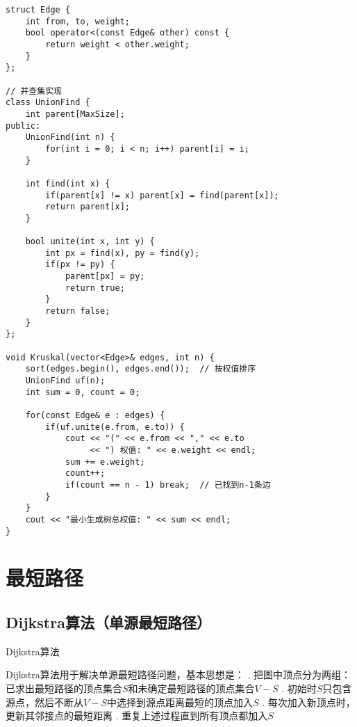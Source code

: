 \documentclass[12pt,a4paper]{amsart}
\begin{document}
\begin{lstlisting}[caption=Kruskal算法实现]
struct Edge {
    int from, to, weight;
    bool operator<(const Edge& other) const {
        return weight < other.weight;
    }
};

// 并查集实现
class UnionFind {
    int parent[MaxSize];
public:
    UnionFind(int n) {
        for(int i = 0; i < n; i++) parent[i] = i;
    }
    
    int find(int x) {
        if(parent[x] != x) parent[x] = find(parent[x]);
        return parent[x];
    }
    
    bool unite(int x, int y) {
        int px = find(x), py = find(y);
        if(px != py) {
            parent[px] = py;
            return true;
        }
        return false;
    }
};

void Kruskal(vector<Edge>& edges, int n) {
    sort(edges.begin(), edges.end());  // 按权值排序
    UnionFind uf(n);
    int sum = 0, count = 0;
    
    for(const Edge& e : edges) {
        if(uf.unite(e.from, e.to)) {
            cout << "(" << e.from << "," << e.to 
                 << ") 权值: " << e.weight << endl;
            sum += e.weight;
            count++;
            if(count == n - 1) break;  // 已找到n-1条边
        }
    }
    cout << "最小生成树总权值: " << sum << endl;
}
\end{lstlisting}

\section{最短路径}

\subsection{Dijkstra算法（单源最短路径）}

\begin{algorithm}[H]
\caption{Dijkstra算法}
\begin{algorithmic}[1]
\STATE Dijkstra算法用于解决单源最短路径问题，基本思想是：
. 把图中顶点分为两组：已求出最短路径的顶点集合$S$和未确定最短路径的顶点集合$V-S$
. 初始时$S$只包含源点，然后不断从$V-S$中选择到源点距离最短的顶点加入$S$
. 每次加入新顶点时，更新其邻接点的最短距离
. 重复上述过程直到所有顶点都加入$S$
\end{algorithmic}
\end{algorithm}
\end{document}
